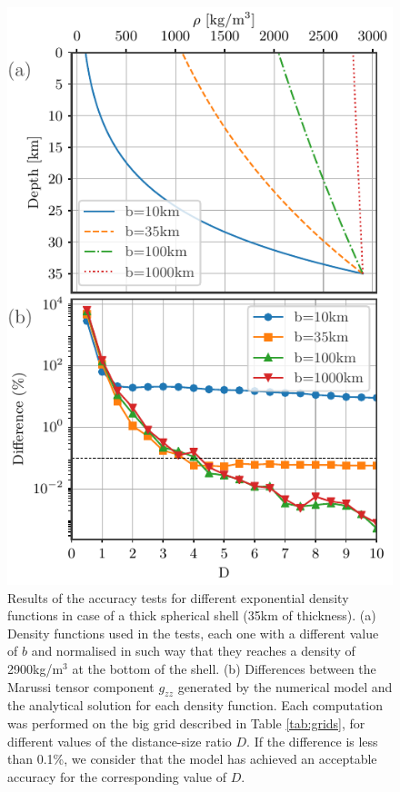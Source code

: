 \documentclass[extra]{gji}
\begin{document}
\begin{figure}
\centering
\includegraphics[width=0.9\linewidth]{figures/Dexp-power-differences-thick.pdf}
\caption{
    Results of the accuracy tests for different exponential density functions in case of a thick spherical shell (35km of thickness).
    (a) Density functions used in the tests, each one with a different value of $b$ and normalised in such way that they reaches a density of 2900kg/m$^{3}$ at the bottom of the shell.
    (b) Differences between the Marussi tensor component $g_{zz}$ generated by the numerical model and the analytical solution for each density function. Each computation was performed on the big grid described in Table \ref{tab:grids}, for different values of the distance-size ratio $D$. If the difference is less than 0.1\%, we consider that the model has achieved an acceptable accuracy for the corresponding value of $D$.
}
\label{fig:D-exp-power-thick}
\end{figure}
\end{document}
